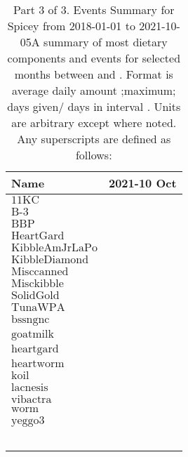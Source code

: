\begin{table}[H]
\centering
\begin{tabular}{|l|r|}
\hline
Name&2021-10 Oct\\
\hline
$\textrm{11KC}$&\\
$\textrm{B-3}$&\\
$\textrm{BBP}$&\\
$\textrm{HeartGard}$&\\
$\textrm{KibbleAmJrLaPo}$&\\
$\textrm{KibbleDiamond}$&\\
$\textrm{Misccanned}$&\\
$\textrm{Misckibble}$&\\
$\textrm{SolidGold}$&\\
$\textrm{TunaWPA}$&\\
$\textrm{bssngnc}$&\\
$\textrm{goatmilk}$&\\
$\textrm{heartgard}$&\\
$\textrm{heartworm}$&\\
$\textrm{koil}$&\\
$\textrm{lacnesis}$&\\
$\textrm{vibactra}$&\\
$\textrm{worm}$&\\
$\textrm{yeggo3}$&\\
&\\
&\\
&\\
&\\
&\\
\hline
\end{tabular}
\caption{Part 3 of 3.  Events Summary for Spicey   from 2018-01-01 to 2021-10-05A summary of most dietary components and events  for selected months between \mjmdatemin and \mjmdatemax. Format is average daily amount ;maximum; days given/ days in interval . Units are arbitrary except where noted. Any  superscripts are defined as follows:  \mjmsuperscripts}
\end{table}
